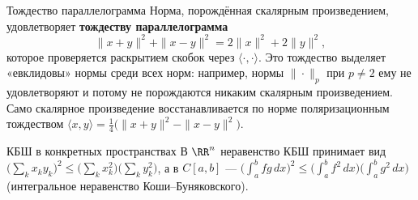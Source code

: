 \begin{Remark}{Тождество параллелограмма}{}
	Норма, порождённая скалярным произведением, удовлетворяет
	\textbf{тождеству параллелограмма}
	\[
	\|x+y\|^2+\|x-y\|^2=2\|x\|^2+2\|y\|^2,
	\]
	которое проверяется раскрытием скобок через $\langle\cdot,\cdot\rangle$.
	Это тождество выделяет «евклидовы» нормы среди всех норм: например, нормы
	$\|\cdot\|_p$ при $p\ne2$ ему не удовлетворяют и потому не порождаются
	никаким скалярным произведением. Само скалярное произведение
	восстанавливается по норме поляризационным тождеством
	$\langle x,y\rangle=\tfrac14\bigl(\|x+y\|^2-\|x-y\|^2\bigr)$.
\end{Remark}

\begin{Example}{КБШ в конкретных пространствах}{}
	В $\RR^n$ неравенство КБШ принимает вид
	$\bigl(\sum_{k} x_k y_k\bigr)^2\le\bigl(\sum_k x_k^2\bigr)\bigl(\sum_k y_k^2\bigr)$,
	а в $C[a,b]$ ---
	$\bigl(\int_a^b fg\,dx\bigr)^2\le\bigl(\int_a^b f^2\,dx\bigr)\bigl(\int_a^b g^2\,dx\bigr)$
	(интегральное неравенство Коши--Буняковского).
\end{Example}
